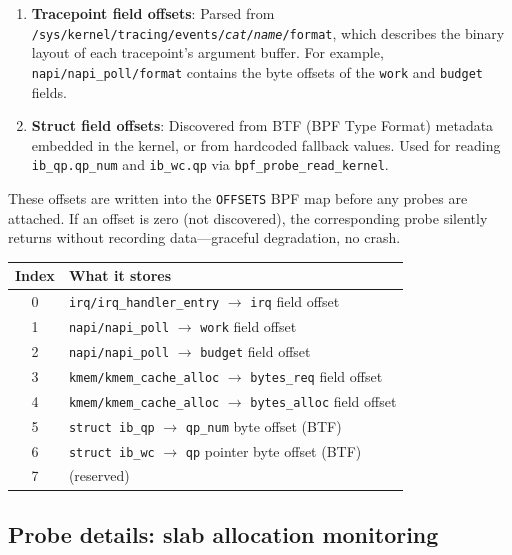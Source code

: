 \documentclass[11pt]{article}
\begin{document}
\begin{enumerate}[nosep]
  \item \textbf{Tracepoint field offsets}: Parsed from
        \texttt{/sys/kernel/tracing/events/\textit{cat}/\textit{name}/format},
        which describes the binary layout of each tracepoint's argument
        buffer. For example, \texttt{napi/napi\_poll/format} contains the
        byte offsets of the \texttt{work} and \texttt{budget} fields.
  \item \textbf{Struct field offsets}: Discovered from BTF (BPF Type
        Format) metadata embedded in the kernel, or from hardcoded
        fallback values. Used for reading \texttt{ib\_qp.qp\_num} and
        \texttt{ib\_wc.qp} via \texttt{bpf\_probe\_read\_kernel}.
\end{enumerate}

These offsets are written into the \texttt{OFFSETS} BPF map before any
probes are attached. If an offset is zero (not discovered), the
corresponding probe silently returns without recording data---graceful
degradation, no crash.

\begin{center}
\small
\begin{tabular}{cl}
\toprule
Index & What it stores \\
\midrule
0 & \texttt{irq/irq\_handler\_entry} $\rightarrow$ \texttt{irq} field offset \\
1 & \texttt{napi/napi\_poll} $\rightarrow$ \texttt{work} field offset \\
2 & \texttt{napi/napi\_poll} $\rightarrow$ \texttt{budget} field offset \\
3 & \texttt{kmem/kmem\_cache\_alloc} $\rightarrow$ \texttt{bytes\_req} field offset \\
4 & \texttt{kmem/kmem\_cache\_alloc} $\rightarrow$ \texttt{bytes\_alloc} field offset \\
5 & \texttt{struct ib\_qp} $\rightarrow$ \texttt{qp\_num} byte offset (BTF) \\
6 & \texttt{struct ib\_wc} $\rightarrow$ \texttt{qp} pointer byte offset (BTF) \\
7 & (reserved) \\
\bottomrule
\end{tabular}
\end{center}

\subsection{Probe details: slab allocation monitoring}
\end{document}
